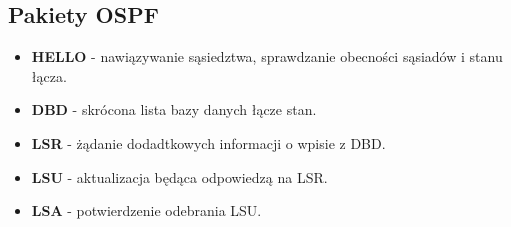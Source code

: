 \documentclass[../sk-egzamin.tex]{subfiles}
\begin{document}
\subsection*{Pakiety OSPF}
\begin{itemize}
    \item \textbf{HELLO} - nawiązywanie sąsiedztwa, sprawdzanie obecności
    sąsiadów i stanu łącza.
    \item \textbf{DBD} - skrócona lista bazy danych łącze stan.
    \item \textbf{LSR} - żądanie dodadtkowych informacji o wpisie z DBD.
    \item \textbf{LSU} - aktualizacja będąca odpowiedzą na LSR.
    \item \textbf{LSA} - potwierdzenie odebrania LSU.
\end{itemize}


\pagebreak
\end{document}
